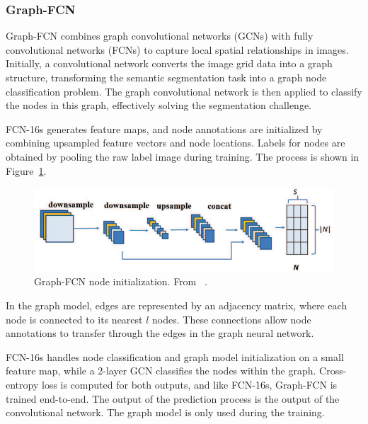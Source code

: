 \subsubsection{Graph-FCN}

Graph-FCN combines graph convolutional networks (GCNs) with fully convolutional networks (FCNs) to capture local spatial relationships in images. Initially, a convolutional network converts the image grid data into a graph structure, transforming the semantic segmentation task into a graph node classification problem. The graph convolutional network is then applied to classify the nodes in this graph, effectively solving the segmentation challenge.

FCN-16s generates feature maps, and node annotations are initialized by combining upsampled feature vectors and node locations. Labels for nodes are obtained by pooling the raw label image during training. The process is shown in Figure~\ref{fig:graphfcn_node_init}.

\begin{figure}
    \centering
    \includegraphics[width=0.8\linewidth]{images/graphfcn_node_init.png}
    \caption{Graph-FCN node initialization. From ~\cite{lu2020graphfcnimagesemanticsegmentation}.}
    \label{fig:graphfcn_node_init}
\end{figure}

In the graph model, edges are represented by an adjacency matrix, where each node is connected to its nearest $l$ nodes. These connections allow node annotations to transfer through the edges in the graph neural network.

FCN-16s handles node classification and graph model initialization on a small feature map, while a 2-layer GCN classifies the nodes within the graph. Cross-entropy loss is computed for both outputs, and like FCN-16s, Graph-FCN is trained end-to-end. The output of the prediction process is the output of the convolutional network. The graph model is only used during the training.

